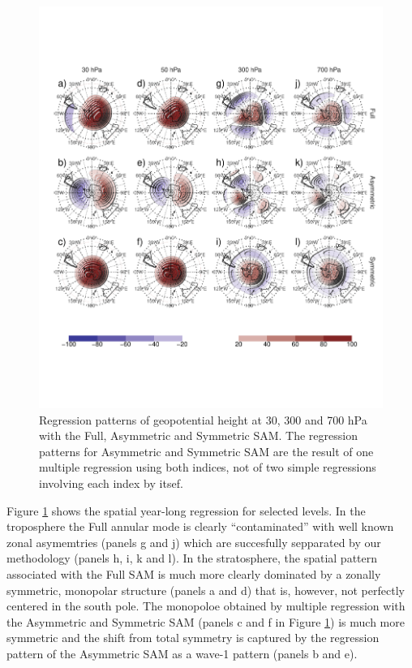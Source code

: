 \documentclass[]{ametsocV5}
\begin{document}
\begin{figure}
\includegraphics{2d-regr-1} \caption[Regression patterns of geopotential height at 30, 300 and 700 hPa with the Full, Asymmetric and Symmetric SAM]{Regression patterns of geopotential height at 30, 300 and 700 hPa with the Full, Asymmetric and Symmetric SAM. The regression patterns for Asymmetric and Symmetric SAM are the result of one multiple regression using both indices, not of two simple regressions involving each index by itsef.}\label{fig:2d-regr}
\end{figure}

Figure \ref{fig:2d-regr} shows the spatial year-long regression for
selected levels. In the troposphere the Full annular mode is clearly
``contaminated'' with well known zonal asymemtries (panels g and j)
which are succesfully sepparated by our methodology (panels h, i, k and
l). In the stratosphere, the spatial pattern associated with the Full
SAM is much more clearly dominated by a zonally symmetric, monopolar
structure (panels a and d) that is, however, not perfectly centered in
the south pole. The monopoloe obtained by multiple regression with the
Asymmetric and Symmetric SAM (panels c and f in Figure
\ref{fig:2d-regr}) is much more symmetric and the shift from total
symmetry is captured by the regression pattern of the Asymmetric SAM as
a wave-1 pattern (panels b and e).
\end{document}
